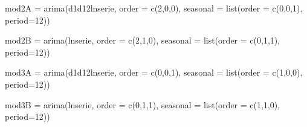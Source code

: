 \documentclass[
]{article}
\newenvironment{Shaded}{\begin{snugshade}}{\end{snugshade}}
\newcommand{\AttributeTok}[1]{\textcolor[rgb]{0.77,0.63,0.00}{#1}}
\newcommand{\DecValTok}[1]{\textcolor[rgb]{0.00,0.00,0.81}{#1}}
\newcommand{\FunctionTok}[1]{\textcolor[rgb]{0.00,0.00,0.00}{#1}}
\newcommand{\NormalTok}[1]{#1}
\newcommand{\OtherTok}[1]{\textcolor[rgb]{0.56,0.35,0.01}{#1}}
\begin{document}
\begin{Shaded}
\begin{Highlighting}[]
\NormalTok{mod2A }\OtherTok{=} \FunctionTok{arima}\NormalTok{(d1d12lnserie, }\AttributeTok{order =} \FunctionTok{c}\NormalTok{(}\DecValTok{2}\NormalTok{,}\DecValTok{0}\NormalTok{,}\DecValTok{0}\NormalTok{), }\AttributeTok{seasonal =} \FunctionTok{list}\NormalTok{(}\AttributeTok{order =} \FunctionTok{c}\NormalTok{(}\DecValTok{0}\NormalTok{,}\DecValTok{0}\NormalTok{,}\DecValTok{1}\NormalTok{), }\AttributeTok{period=}\DecValTok{12}\NormalTok{))}
\end{Highlighting}
\end{Shaded}

\begin{Shaded}
\begin{Highlighting}[]
\NormalTok{mod2B }\OtherTok{=} \FunctionTok{arima}\NormalTok{(lnserie, }\AttributeTok{order =} \FunctionTok{c}\NormalTok{(}\DecValTok{2}\NormalTok{,}\DecValTok{1}\NormalTok{,}\DecValTok{0}\NormalTok{), }\AttributeTok{seasonal =} \FunctionTok{list}\NormalTok{(}\AttributeTok{order =} \FunctionTok{c}\NormalTok{(}\DecValTok{0}\NormalTok{,}\DecValTok{1}\NormalTok{,}\DecValTok{1}\NormalTok{), }\AttributeTok{period=}\DecValTok{12}\NormalTok{))}
\end{Highlighting}
\end{Shaded}

\begin{Shaded}
\begin{Highlighting}[]
\NormalTok{mod3A }\OtherTok{=} \FunctionTok{arima}\NormalTok{(d1d12lnserie, }\AttributeTok{order =} \FunctionTok{c}\NormalTok{(}\DecValTok{0}\NormalTok{,}\DecValTok{0}\NormalTok{,}\DecValTok{1}\NormalTok{), }\AttributeTok{seasonal =} \FunctionTok{list}\NormalTok{(}\AttributeTok{order =} \FunctionTok{c}\NormalTok{(}\DecValTok{1}\NormalTok{,}\DecValTok{0}\NormalTok{,}\DecValTok{0}\NormalTok{), }\AttributeTok{period=}\DecValTok{12}\NormalTok{))}
\end{Highlighting}
\end{Shaded}

\begin{Shaded}
\begin{Highlighting}[]
\NormalTok{mod3B }\OtherTok{=} \FunctionTok{arima}\NormalTok{(lnserie, }\AttributeTok{order =} \FunctionTok{c}\NormalTok{(}\DecValTok{0}\NormalTok{,}\DecValTok{1}\NormalTok{,}\DecValTok{1}\NormalTok{), }\AttributeTok{seasonal =} \FunctionTok{list}\NormalTok{(}\AttributeTok{order =} \FunctionTok{c}\NormalTok{(}\DecValTok{1}\NormalTok{,}\DecValTok{1}\NormalTok{,}\DecValTok{0}\NormalTok{), }\AttributeTok{period=}\DecValTok{12}\NormalTok{))}
\end{Highlighting}
\end{Shaded}
\end{document}
